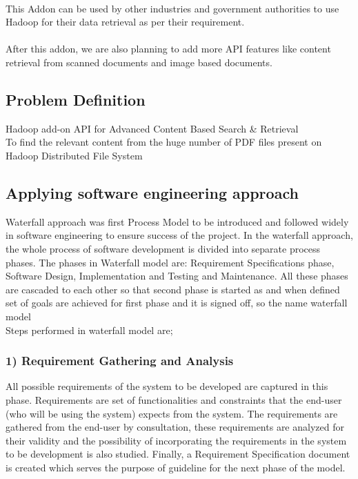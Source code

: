 \paragraph{} This Addon can be used by other industries and government authorities to use Hadoop for their data retrieval as per their requirement.
\paragraph{} After this addon, we are also planning to add more API features like content retrieval from scanned documents and image based documents.

\subsection{Problem Definition}
Hadoop add-on API for Advanced Content Based Search \& Retrieval \\
To find the relevant content from the huge number of PDF files present on Hadoop Distributed File System

\subsection{Applying software engineering approach}
Waterfall approach was first Process Model to be introduced and followed widely in software engineering to ensure success of the project. In the waterfall approach, the whole process of software development is divided into separate process phases. The phases in Waterfall model are: Requirement Specifications phase, Software Design, Implementation and Testing and Maintenance. All these phases are cascaded to each other so that second phase is started as and when defined set of goals are achieved for first phase and it is signed off, so the name waterfall model \\

Steps performed in waterfall model are;
\subsubsection{1) Requirement Gathering and Analysis}
All possible requirements of the system to be developed are captured in this phase. Requirements are set of functionalities and constraints that the end-user (who will be using the system) expects from the system. The requirements are gathered from the end-user by consultation, these requirements are analyzed for their validity and the possibility of incorporating the requirements in the system to be development is also studied. Finally, a Requirement Specification document is created which serves the purpose of guideline for the next phase of the model.\\
